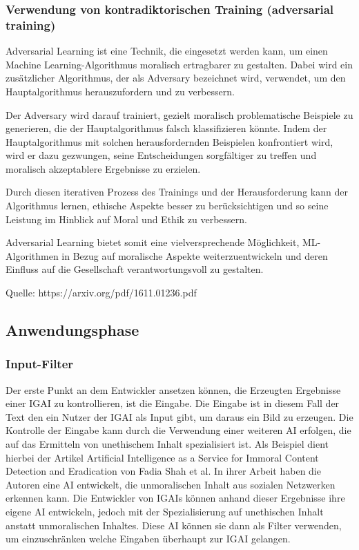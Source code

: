 \documentclass[12pt]{article}
\begin{document}
\subsubsection{Verwendung von kontradiktorischen Training (adversarial training)}
Adversarial Learning ist eine Technik, die eingesetzt werden kann, um einen Machine Learning-Algorithmus moralisch ertragbarer zu gestalten. 
Dabei wird ein zusätzlicher Algorithmus, der als Adversary bezeichnet wird, verwendet, um den Hauptalgorithmus herauszufordern und zu verbessern. 

Der Adversary wird darauf trainiert, gezielt moralisch problematische Beispiele zu generieren, die der Hauptalgorithmus falsch klassifizieren könnte. 
Indem der Hauptalgorithmus mit solchen herausfordernden Beispielen konfrontiert wird, wird er dazu gezwungen, seine Entscheidungen sorgfältiger zu treffen und moralisch akzeptablere Ergebnisse zu erzielen. 

Durch diesen iterativen Prozess des Trainings und der Herausforderung kann der Algorithmus lernen, ethische Aspekte besser zu berücksichtigen und so seine Leistung im Hinblick auf Moral und Ethik zu verbessern. 

Adversarial Learning bietet somit eine vielversprechende Möglichkeit, ML-Algorithmen in Bezug auf moralische Aspekte weiterzuentwickeln und deren Einfluss auf die Gesellschaft verantwortungsvoll zu gestalten.

Quelle: https://arxiv.org/pdf/1611.01236.pdf

\subsection{Anwendungsphase}

\subsubsection{Input-Filter}
Der erste Punkt an dem Entwickler ansetzen können, die Erzeugten Ergebnisse einer IGAI zu kontrollieren, ist die Eingabe. Die Eingabe ist in diesem Fall der Text den ein Nutzer der IGAI als Input gibt, um daraus ein Bild zu erzeugen. Die Kontrolle der Eingabe kann durch die Verwendung einer weiteren AI erfolgen, die auf das Ermitteln von unethischem Inhalt spezialisiert ist. Als Beispiel dient hierbei der Artikel Artificial Intelligence as a Service for Immoral Content Detection and Eradication von Fadia Shah et al. In ihrer Arbeit haben die Autoren eine AI entwickelt, die unmoralischen Inhalt aus sozialen Netzwerken erkennen kann. Die Entwickler von IGAIs können anhand dieser Ergebnisse ihre eigene AI entwickeln, jedoch mit der Spezialisierung auf unethischen Inhalt anstatt unmoralischen Inhaltes. Diese AI können sie dann als Filter verwenden, um einzuschränken welche Eingaben überhaupt zur IGAI gelangen.
\end{document}
